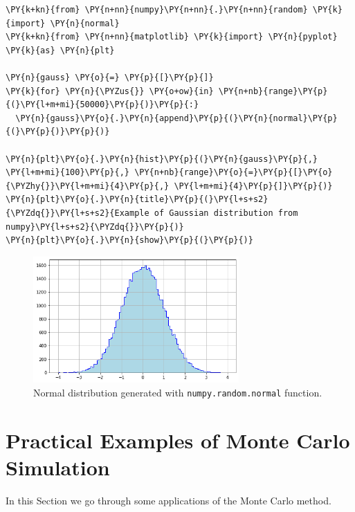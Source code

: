  \begin{tcolorbox}[breakable, size=fbox, boxrule=1pt, pad at break*=1mm,colback=cellbackground, colframe=cellborder]
\begin{Verbatim}[commandchars=\\\{\}]
\PY{k+kn}{from} \PY{n+nn}{numpy}\PY{n+nn}{.}\PY{n+nn}{random} \PY{k}{import} \PY{n}{normal}
\PY{k+kn}{from} \PY{n+nn}{matplotlib} \PY{k}{import} \PY{n}{pyplot} \PY{k}{as} \PY{n}{plt}

\PY{n}{gauss} \PY{o}{=} \PY{p}{[}\PY{p}{]}
\PY{k}{for} \PY{n}{\PYZus{}} \PY{o+ow}{in} \PY{n+nb}{range}\PY{p}{(}\PY{l+m+mi}{50000}\PY{p}{)}\PY{p}{:}
  \PY{n}{gauss}\PY{o}{.}\PY{n}{append}\PY{p}{(}\PY{n}{normal}\PY{p}{(}\PY{p}{)}\PY{p}{)}
  
\PY{n}{plt}\PY{o}{.}\PY{n}{hist}\PY{p}{(}\PY{n}{gauss}\PY{p}{,} \PY{l+m+mi}{100}\PY{p}{,} \PY{n+nb}{range}\PY{o}{=}\PY{p}{[}\PY{o}{\PYZhy{}}\PY{l+m+mi}{4}\PY{p}{,} \PY{l+m+mi}{4}\PY{p}{]}\PY{p}{)}
\PY{n}{plt}\PY{o}{.}\PY{n}{title}\PY{p}{(}\PY{l+s+s2}{\PYZdq{}}\PY{l+s+s2}{Example of Gaussian distribution from numpy}\PY{l+s+s2}{\PYZdq{}}\PY{p}{)}
\PY{n}{plt}\PY{o}{.}\PY{n}{show}\PY{p}{(}\PY{p}{)}
\end{Verbatim}
\end{tcolorbox}

 \begin{figure}
   \centering
   \includegraphics[width=0.7\textwidth]{lesson4_files/lesson4_5_0.png}
   \caption{Normal distribution generated with \texttt{numpy.random.normal} function.}
\label{fig:gaussian_dist}
 \end{figure}

\section{Practical Examples of Monte Carlo
Simulation}\label{example-of-monte-carlo-simulation}

In this Section we go through some applications of the Monte Carlo method.


